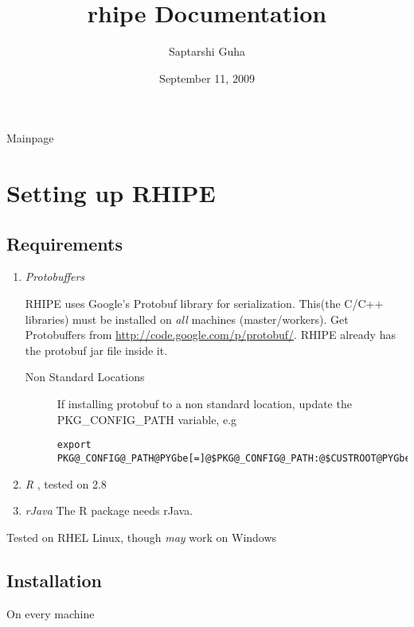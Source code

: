 \documentclass[letterpaper,10pt,english]{manual}
\title{rhipe Documentation}
\date{September 11, 2009}
\author{Saptarshi Guha}
\begin{document}
\maketitle
\tableofcontents



Mainpage

\resetcurrentobjects
\hypertarget{--doc-installation}{}

\chapter{Setting up RHIPE}


\section{Requirements}
\begin{enumerate}
\item {} 
\emph{Protobuffers}

RHIPE uses Google's Protobuf library for serialization. This(the C/C++
libraries) must be installed on \emph{all} machines (master/workers). Get
Protobuffers from \href{http://code.google.com/p/protobuf/}{http://code.google.com/p/protobuf/}. RHIPE already has the
protobuf jar file inside it.
\begin{description}
\item[Non Standard Locations]
If installing protobuf to a non standard location, update the
PKG\_CONFIG\_PATH variable, e.g

\begin{Verbatim}[commandchars=@\[\]]
export PKG@_CONFIG@_PATH@PYGbe[=]@$PKG@_CONFIG@_PATH:@$CUSTROOT@PYGbe[/]lib@PYGbe[/]pkgconfig@PYGbe[/]
\end{Verbatim}

\end{description}

\item {} 
\emph{R} , tested on 2.8

\item {} 
\emph{rJava} The R package needs rJava.

\end{enumerate}

Tested on RHEL Linux, though \emph{may} work on Windows


\section{Installation}

On every machine
\end{document}
